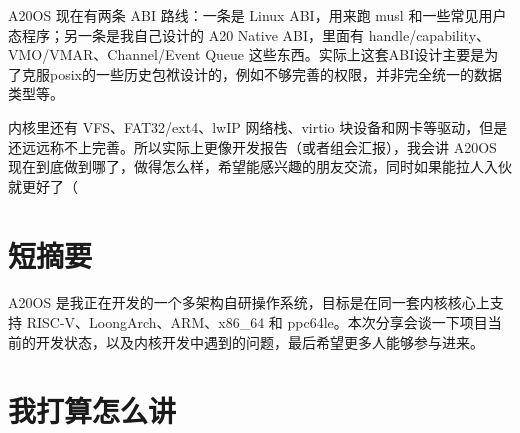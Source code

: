 \documentclass[UTF8,zihao=-4]{ctexart}
\begin{document}
A20OS 现在有两条 ABI 路线：一条是 Linux ABI，用来跑 musl 和一些常见用户态程序；另一条是我自己设计的 A20 Native ABI，里面有 handle/capability、VMO/VMAR、Channel/Event Queue 这些东西。实际上这套ABI设计主要是为了克服posix的一些历史包袱设计的，例如不够完善的权限，并非完全统一的数据类型等。

内核里还有 VFS、FAT32/ext4、lwIP 网络栈、virtio 块设备和网卡等驱动，但是还远远称不上完善。所以实际上更像开发报告（或者组会汇报），我会讲 A20OS 现在到底做到哪了，做得怎么样，希望能感兴趣的朋友交流，同时如果能拉人入伙就更好了（

\section*{短摘要}

A20OS 是我正在开发的一个多架构自研操作系统，目标是在同一套内核核心上支持 RISC-V、LoongArch、ARM、x86\_64 和 ppc64le。本次分享会谈一下项目当前的开发状态，以及内核开发中遇到的问题，最后希望更多人能够参与进来。

\section*{我打算怎么讲}
\end{document}
